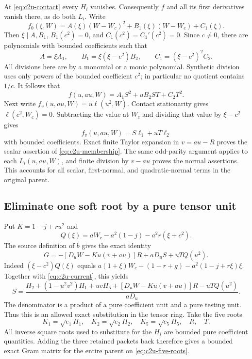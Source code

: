 At \eqref{eq:c2u-contact} every $H_i$ vanishes. Consequently $f$ and
all its first derivatives vanish there, as do both $L_i$. Write
\[
 f_0(\xi,W)=A(\xi)(W-W_c)^2+B_1(\xi)(W-W_c)+C_1(\xi).
\]
Then $\xi\mid A,B_1$, $B_1(c^2)=0$, and
$C_1(c^2)=C_1'(c^2)=0$. Since $c\ne0$, there are polynomials with
bounded coefficients such that
\[
 A=\xi A_1,\qquad B_1=\xi(\xi-c^2)B_2,\qquad
 C_1=(\xi-c^2)^2C_2.
\]
All divisions here are by a monomial or a monic polynomial.
Synthetic division uses only powers of the bounded coefficient $c^2$;
in particular no quotient contains $1/c$. It follows that
\[
 f(u,au,W)=A_1S^2+uB_2ST+C_2T^2.
\]
Next write $f_v(u,au,W)=u\ell(u^2,W)$. Contact stationarity gives
$\ell(c^2,W_c)=0$. Subtracting the value at $W_c$ and dividing that
value by $\xi-c^2$ gives
\[
 f_v(u,au,W)=S\ell_1+uT\ell_2
\]
with bounded coefficients. Exact finite Taylor expansion in $v=au-R$
proves the scalar assertion of \eqref{eq:c2u-membership}. The same
odd-parity argument applies to each $L_i(u,au,W)$, and finite division
by $v-au$ proves the normal assertions. This accounts for all scalar,
first-normal, and quadratic-normal terms in the original parent.

\subsection{Eliminate one soft root by a pure tensor unit}
Put $K=1-j+ru^2$ and
\[
Q(\xi)=aW_c-a^2(1-j)-a^2r(\xi+c^2).
\]
The source definition of $b$ gives the exact identity
\begin{equation}
G=-[D_uW-Ku(v+au)]R+aD_uS+uTQ(u^2).
\label{eq:c2u-current-soft}
\end{equation}
Indeed $(\xi-c^2)Q(\xi)$ equals
$a(1+\xi)W_c-(1-r+g)-a^2(1-j+r\xi)\xi$.
Together with \eqref{eq:c2u-current}, this yields
\begin{equation}
S=\frac{H_2+(1-u^2v^2)H_1+uvH_5
 +[D_uW-Ku(v+au)]R-uTQ(u^2)}{aD_u}.
\label{eq:c2u-eliminate-S}
\end{equation}
The denominator is a product of a pure coefficient unit and a pure
testing unit.  Thus this is an allowed exact substitution in the tensor
ring.  Take the five roots
\begin{equation}
K_1=\sqrt{e_1}H_1,\quad K_2=\sqrt{e_2}H_2,\quad
K_5=\sqrt{e_5}H_5,\quad R,\quad T.
\label{eq:c2u-five-roots}
\end{equation}
All inverse square roots used to substitute for the $H_i$ are bounded
pure coefficient quantities.  Adding the three retained packets back
therefore gives a bounded exact Gram matrix for the entire parent on
\eqref{eq:c2u-five-roots}.

